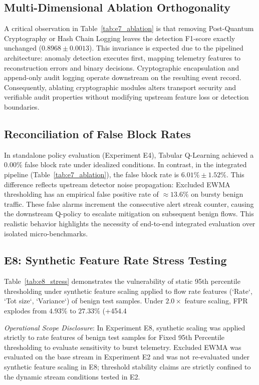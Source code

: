 \documentclass{ieeeaccess}
\begin{document}
\subsection{Multi-Dimensional Ablation Orthogonality}
A critical observation in Table~\ref{tab:e7_ablation} is that removing Post-Quantum Cryptography or Hash Chain Logging leaves the detection F1-score exactly unchanged ($0.8968 \pm 0.0013$). This invariance is expected due to the pipelined architecture: anomaly detection executes first, mapping telemetry features to reconstruction errors and binary decisions. Cryptographic encapsulation and append-only audit logging operate downstream on the resulting event record. Consequently, ablating cryptographic modules alters transport security and verifiable audit properties without modifying upstream feature loss or detection boundaries.

\subsection{Reconciliation of False Block Rates}
In standalone policy evaluation (Experiment E4), Tabular Q-Learning achieved a $0.00\%$ false block rate under idealized conditions. In contrast, in the integrated pipeline (Table~\ref{tab:e7_ablation}), the false block rate is $6.01\% \pm 1.52\%$. This difference reflects upstream detector noise propagation: Excluded EWMA thresholding has an empirical false positive rate of $\approx 13.6\%$ on bursty benign traffic. These false alarms increment the consecutive alert streak counter, causing the downstream Q-policy to escalate mitigation on subsequent benign flows. This realistic behavior highlights the necessity of end-to-end integrated evaluation over isolated micro-benchmarks.

\subsection{E8: Synthetic Feature Rate Stress Testing}
Table~\ref{tab:e8_stress} demonstrates the vulnerability of static 95th percentile thresholding under synthetic feature scaling applied to flow rate features (`Rate`, `Tot size`, `Variance`) of benign test samples. Under $2.0\times$ feature scaling, FPR explodes from $4.93\%$ to $27.33\%$ (+454.4%

\textit{Operational Scope Disclosure}: In Experiment E8, synthetic scaling was applied strictly to rate features of benign test samples for Fixed 95th Percentile thresholding to evaluate sensitivity to burst telemetry. Excluded EWMA was evaluated on the base stream in Experiment E2 and was not re-evaluated under synthetic feature scaling in E8; threshold stability claims are strictly confined to the dynamic stream conditions tested in E2.
\end{document}
